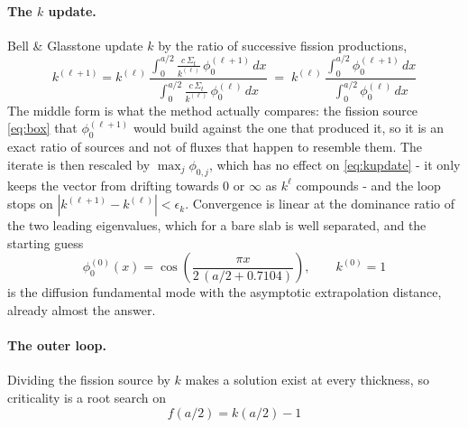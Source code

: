 \documentclass[11pt]{article}
\begin{document}
\paragraph{The $k$ update.} Bell \& Glasstone update $k$ by the ratio of successive fission
productions,
\begin{equation}
    k^{(\ell+1)} = k^{(\ell)}\,
    {\frac{\displaystyle\int_0^{a/2} \frac{c\,\Sigma_t}{k^{(\ell)}}\,\phi_0^{(\ell+1)}\,dx}
                          {\displaystyle\int_0^{a/2} \frac{c\,\Sigma_t}{k^{(\ell)}}\,\phi_0^{(\ell)}\,dx}
    \;=\; k^{(\ell)}\,}
    \frac{\displaystyle\int_0^{a/2} \phi_0^{(\ell+1)}\,dx}
         {\displaystyle\int_0^{a/2} \phi_0^{(\ell)}\,dx}
    \label{eq:kupdate}
\end{equation}
The middle form is what the method actually compares: the fission source
\eqref{eq:box} that $\phi_0^{(\ell+1)}$ would build against the one that produced it, so it is
an exact ratio of sources and not of fluxes that happen to resemble them. The iterate is then rescaled by $\max_j\phi_{0,j}$, which
has no effect on \eqref{eq:kupdate} - it only keeps the vector from drifting towards $0$ or
$\infty$ as $k^{\ell}$ compounds - and the loop stops on $|k^{(\ell+1)}-k^{(\ell)}|<\epsilon_k$.
Convergence is linear at the dominance ratio of the two leading eigenvalues, which for a bare
slab is well separated, and the starting guess
\begin{equation}
    \phi_0^{(0)}(x)=\cos\!\left(\frac{\pi x}{2\,(a/2+0.7104)}\right),\qquad k^{(0)}=1
\end{equation}
is the diffusion fundamental mode with the asymptotic extrapolation distance, already almost
the answer.

\paragraph{The outer loop.} Dividing the fission source by $k$ makes a solution exist at every
thickness, so criticality is a root search on
\begin{equation}
    f(a/2) = k(a/2) - 1
\end{equation}
\end{document}
